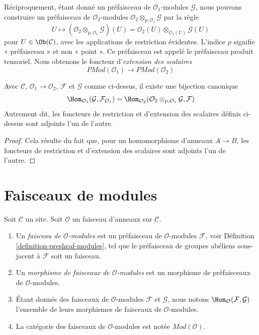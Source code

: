 \medskip\noindent
Réciproquement, étant donné un préfaisceau de $\mathcal{O}_1$-modules
$\mathcal{G}$, nous pouvons construire un préfaisceau de
$\mathcal{O}_2$-modules
$\mathcal{O}_2 \otimes_{p, \mathcal{O}_1} \mathcal{G}$
par la règle
$$
U \longmapsto
\left(\mathcal{O}_2 \otimes_{p, \mathcal{O}_1} \mathcal{G}\right)(U)
=
\mathcal{O}_2(U) \otimes_{\mathcal{O}_1(U)} \mathcal{G}(U)
$$
pour $U \in \Ob(\mathcal{C})$, avec les applications de restriction évidentes.
L'indice $p$ signifie « préfaisceau » et non « point ». Ce préfaisceau est
appelé le préfaisceau produit tensoriel. Nous obtenons le foncteur
d'{\it extension des scalaires}
$$
\textit{PMod}(\mathcal{O}_1)
\longrightarrow
\textit{PMod}(\mathcal{O}_2)
$$

\begin{lemma}
\label{lemma-adjointness-tensor-restrict-presheaves}
Avec $\mathcal{C}$, $\mathcal{O}_1 \to \mathcal{O}_2$, $\mathcal{F}$ et
$\mathcal{G}$ comme ci-dessus, il existe une bijection canonique
$$
\Hom_{\mathcal{O}_1}(\mathcal{G}, \mathcal{F}_{\mathcal{O}_1})
=
\Hom_{\mathcal{O}_2}(
\mathcal{O}_2 \otimes_{p, \mathcal{O}_1} \mathcal{G},
\mathcal{F}
)
$$
Autrement dit, les foncteurs de restriction et d'extension des scalaires
définis ci-dessus sont adjoints l'un de l'autre.
\end{lemma}

\begin{proof}
Cela résulte du fait que, pour un homomorphisme d'anneaux $A \to B$, les
foncteurs de restriction et d'extension des scalaires sont adjoints l'un de
l'autre.
\end{proof}


\section{Faisceaux de modules}
\label{section-sheaves-modules}

\begin{definition}
\label{definition-sheaf-modules}
Soit $\mathcal{C}$ un site. Soit $\mathcal{O}$ un faisceau d'anneaux sur
$\mathcal{C}$.
\begin{enumerate}
\item Un {\it faisceau de $\mathcal{O}$-modules} est un préfaisceau de
$\mathcal{O}$-modules $\mathcal{F}$, voir Définition
\ref{definition-presheaf-modules}, tel que le préfaisceau de groupes abéliens
sous-jacent à $\mathcal{F}$ soit un faisceau.
\item Un {\it morphisme de faisceaux de $\mathcal{O}$-modules} est un
morphisme de préfaisceaux de $\mathcal{O}$-modules.
\item Étant donnés des faisceaux de $\mathcal{O}$-modules
$\mathcal{F}$ et $\mathcal{G}$, nous notons
$\Hom_\mathcal{O}(\mathcal{F}, \mathcal{G})$ l'ensemble de leurs morphismes de
faisceaux de $\mathcal{O}$-modules.
\item La catégorie des faisceaux de $\mathcal{O}$-modules est notée
$\textit{Mod}(\mathcal{O})$.
\end{enumerate}
\end{definition}

